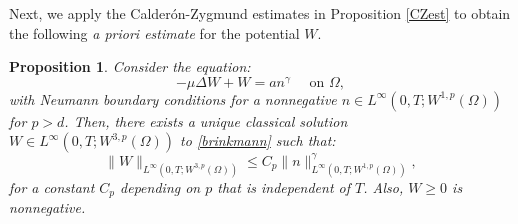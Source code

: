 \documentclass[12pt]{article}
\theoremstyle{plain}
\newtheorem{proposition}{Proposition}[section]
\begin{document}
Next, we apply the Calder\'{o}n-Zygmund estimates in Proposition \ref{CZest} to obtain the following \textit{a priori estimate} for the potential $W$. 

\begin{proposition}\label{nonnegativeW}
    Consider the equation:
    \begin{equation}\label{brinkmann}
        -\mu \Delta W + W = an^{\gamma} \quad \text{ on } \Omega,
    \end{equation}
    with Neumann boundary conditions for a nonnegative $n \in L^{\infty}(0, T; W^{1, p}(\Omega))$ for $p > d$. Then, there exists a unique classical solution $W \in L^{\infty}(0, T; W^{3, p}(\Omega))$ to \eqref{brinkmann} such that:
    \begin{equation*}
        \|W\|_{L^{\infty}(0, T; W^{3, p}(\Omega))} \le C_p\|n\|_{L^{\infty}(0, T; W^{1, p}(\Omega))}^{\gamma},
    \end{equation*}
    for a constant $C_p$ depending on $p$ that is independent of $T$. Also, $W \ge 0$ is nonnegative.
\end{proposition}
\end{document}
